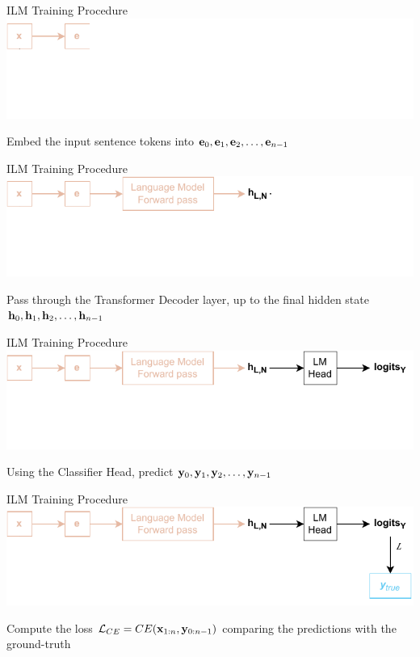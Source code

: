 \begin{frame}[noframenumbering]{ILM Training Procedure}
    \includegraphics[width=\linewidth]{assets/grad_lm_head_parallelism_1.drawio.pdf}
    \vspace{1.5cm}
    
    \centering
    Embed the input sentence tokens into $\mathbf{e}_0, \mathbf{e}_1, \mathbf{e}_2, \dots, \mathbf{e}_{n-1}$
\end{frame}

\begin{frame}[noframenumbering]{ILM Training Procedure}
    \includegraphics[width=\linewidth]{assets/grad_lm_head_parallelism_2.drawio.pdf}
    \vspace{1.5cm}
    
    \centering
    Pass through the Transformer Decoder layer, up to the final hidden state $\mathbf{h}_0, \mathbf{h}_1, \mathbf{h}_2, \dots, \mathbf{h}_{n-1}$
\end{frame}

\begin{frame}[noframenumbering]{ILM Training Procedure}
    \includegraphics[width=\linewidth]{assets/grad_lm_head_parallelism_3.drawio.pdf}
    \vspace{1.5cm}
    
    \centering
    Using the Classifier Head, predict $\mathbf{y}_0, \mathbf{y}_1, \mathbf{y}_2, \dots, \mathbf{y}_{n-1}$
\end{frame}

\begin{frame}[noframenumbering]{ILM Training Procedure}
    \includegraphics[width=\linewidth]{assets/grad_lm_head_parallelism_4.drawio.pdf}
    \vspace{1.5cm}
    
    \centering
    Compute the loss $\mathcal{L}_{CE} = CE(\mathbf{x}_{1:n}, \mathbf{y}_{0:n-1})$ comparing the predictions with the ground-truth
\end{frame}

